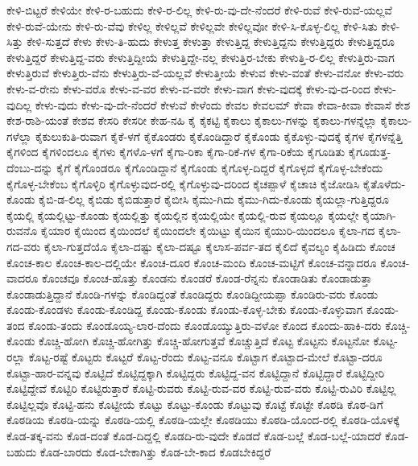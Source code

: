 {ಕೇಳಿ-ಬಿಟ್ಟರೆ
ಕೇಳಿಯೇ
ಕೇಳಿ-ರ-ಬಹುದು
ಕೇಳಿ-ರ-ಲಿಲ್ಲ
ಕೇಳಿ-ರು-ವು-ದೇ-ನೆಂದರೆ
ಕೇಳಿ-ರುವೆ
ಕೇಳಿ-ರುವೆ-ಯಲ್ಲವೆ
ಕೇಳಿ-ರುವೆ-ಯೇನು
ಕೇಳಿ-ರು-ವೆವು
ಕೇಳಿಲ್ಲ
ಕೇಳಿಲ್ಲವೆ
ಕೇಳಿಲ್ಲವೇ
ಕೇಳಿಲ್ಲವೋ
ಕೇಳಿ-ಸಿ-ಕೊಳ್ಳ-ಲಿಲ್ಲ
ಕೇಳಿ-ಸಿತು
ಕೇಳಿ-ಸಿತ್ತು
ಕೇಳಿ-ಸುತ್ತದೆ
ಕೇಳು
ಕೇಳು-ತಿ-ಹುದು
ಕೇಳುತ್ತ
ಕೇಳುತ್ತಾ
ಕೇಳುತ್ತಿದ್ದ
ಕೇಳುತ್ತಿದ್ದನು
ಕೇಳುತ್ತಿದ್ದರು
ಕೇಳುತ್ತಿದ್ದರೂ
ಕೇಳುತ್ತಿದ್ದರೆ
ಕೇಳುತ್ತಿದ್ದ-ವರು
ಕೇಳುತ್ತಿದ್ದೀಯೆ
ಕೇಳುತ್ತಿದ್ದೇ-ನಲ್ಲ
ಕೇಳುತ್ತಿರ-ಬೇಕು
ಕೇಳುತ್ತಿ-ರ-ಲಿಲ್ಲ
ಕೇಳುತ್ತಿರು-ವಾಗ
ಕೇಳುತ್ತಿರುವೆ
ಕೇಳುತ್ತಿರು-ವೆನು
ಕೇಳುತ್ತಿರು-ವೆ-ಯಲ್ಲವೆ
ಕೇಳುತ್ತೀಯೆ
ಕೇಳುವ
ಕೇಳು-ವಂತೆ
ಕೇಳು-ವನೋ
ಕೇಳು-ವರು
ಕೇಳು-ವ-ರೇನು
ಕೇಳು-ವರೊ
ಕೇಳು-ವ-ವರ
ಕೇಳು-ವ-ವರೇ
ಕೇಳು-ವಾಗ
ಕೇಳು-ವುದಕ್ಕೆ
ಕೇಳು-ವು-ದ-ರಿಂದ
ಕೇಳು-ವುದಿಲ್ಲ
ಕೇಳು-ವುದು
ಕೇಳು-ವು-ದೇ-ನೆಂದರೆ
ಕೇಳುವೆ
ಕೇಳೆಂದು
ಕೇವಲ
ಕೇವಲಮ್
ಕೇವಾ
ಕೇವಾ-ಕೀವಾ
ಕೇವಾಸೆ
ಕೇಶ
ಕೇಶ-ರಾಶಿ-ಯಂತೆ
ಕೇಶವ
ಕೇಸರಿ
ಕೇಸರೀ
ಕೇಹ-ನಹಿ
ಕೈ
ಕೈಕಟ್ಟಿ
ಕೈಕಾಲು
ಕೈಕಾಲು-ಗಳನ್ನು
ಕೈಕಾಲು-ಗಳನ್ನೆಲ್ಲಾ
ಕೈಕಾಲು-ಗಳೆಲ್ಲಾ
ಕೈಕುಲುಕುತಿ-ರುವಾಗ
ಕೈಕೆ-ಳಗೆ
ಕೈಕೊಂಡರು
ಕೈಕೊಂಡಿದ್ದಾರೆ
ಕೈಕೊಂಡು
ಕೈಕೊಳ್ಳು-ವುದಕ್ಕೆ
ಕೈಗಳ
ಕೈಗಳನ್ನೆತ್ತಿ
ಕೈಗಳಿಂದ
ಕೈಗಳಿಂದಲೂ
ಕೈಗಳು
ಕೈಗಳೊ-ಳಗೆ
ಕೈಗಾ-ರಿಕಾ
ಕೈಗಾ-ರಿಕೆ-ಗಳ
ಕೈಗಾ-ರಿಕೆಯ
ಕೈಗೂಡಿತು
ಕೈಗೂಡುತ್ತ-ದೆಂಬು-ದನ್ನು
ಕೈಗೆ
ಕೈಗೊಂಡರೂ
ಕೈಗೊಂಡಿದ್ದಾನೆ
ಕೈಗೊಂಡು
ಕೈಗೊಳ್ಳ-ದಿದ್ದರೆ
ಕೈಗೊಳ್ಳದೆ
ಕೈಗೊಳ್ಳ-ಬೇಕೆಂದು
ಕೈಗೊಳ್ಳ-ಬೇಕೆಂಬ
ಕೈಗೊಳ್ಳಿರಿ
ಕೈಗೊಳ್ಳುವುದ-ರಲ್ಲಿ
ಕೈಗೊಳ್ಳುವು-ದರಿಂದ
ಕೈಚಪ್ಪಾಳೆ
ಕೈಚಾಚಿ
ಕೈಜೋಡಿಸಿ
ಕೈತೊಳೆದು-ಕೊಂಡು
ಕೈಬಿ-ಡ-ಲಿಲ್ಲ
ಕೈಬಿಡು
ಕೈಬಿಡುತ್ತಾರೆ
ಕೈಬೀಸಿ
ಕೈಮು-ಗಿದು
ಕೈಮು-ಗಿದು-ಕೊಂಡು
ಕೈಯಲ್ಲಾ-ಗುತ್ತಿದ್ದರೂ
ಕೈಯಲ್ಲಿ
ಕೈಯಲ್ಲಿಟ್ಟು-ಕೊಂಡು
ಕೈಯಲ್ಲಿತ್ತು
ಕೈಯಲ್ಲಿನ
ಕೈಯಲ್ಲಿಯೇ
ಕೈಯಲ್ಲಿ-ರುವ
ಕೈಯಲ್ಲೂ
ಕೈಯಲ್ಲೇ
ಕೈಯಾಗಿ-ರುವನೊ
ಕೈಯಾರ
ಕೈಯಿಂದ
ಕೈಯಿಂದಲೆ
ಕೈಯಿಂದಲೇ
ಕೈಯಿಟ್ಟು
ಕೈಯಿನ
ಕೈಯುರಿ-ಯಿಂದಲೂ
ಕೈಲಾ-ಗದ
ಕೈಲಾ-ಗದ-ವರು
ಕೈಲಾ-ಗುತ್ತದೆಯೊ
ಕೈಲಾ-ದಷ್ಟು
ಕೈಲಾ-ದಷ್ಟೂ
ಕೈಲಾಸ-ಪರ್ವ-ತದ
ಕೈಲಿದೆ
ಕೈವಲ್ಯಂ
ಕೈಹಿಡಿದು
ಕೊಂಚ
ಕೊಂಚ-ಕಾಲ
ಕೊಂಚ-ಕಾಲ-ದಲ್ಲಿಯೇ
ಕೊಂಚ-ದೂರ
ಕೊಂಚ-ಮಂದಿ
ಕೊಂಚ-ಮಟ್ಟಿಗೆ
ಕೊಂಚ-ವನ್ನಾದರೂ
ಕೊಂಚ-ವಾದರೂ
ಕೊಂಚವೂ
ಕೊಂಚ-ಹೊತ್ತು
ಕೊಂಡನು
ಕೊಂಡರೆ
ಕೊಂಡ-ರೆನ್ನನು
ಕೊಂಡಾಡಿತು
ಕೊಂಡಾಡುತ್ತಾ
ಕೊಂಡಾಡುತ್ತಿದ್ದಾನೆ
ಕೊಂಡಿ-ಗಳನ್ನು
ಕೊಂಡಿದ್ದಂತೆ
ಕೊಂಡಿದ್ದರು
ಕೊಂಡಿದ್ದೀಯಪ್ಪಾ
ಕೊಂಡಿರು-ವರು
ಕೊಂಡು
ಕೊಂಡು-ಕೊಂಡಳು
ಕೊಂಡು-ಕೊಂಡಿದ್ದ
ಕೊಂಡು-ಕೊಂಡು
ಕೊಂಡು-ಕೊಳ್ಳ-ಬೇಕು
ಕೊಂಡು-ಕೊಳ್ಳುವಾಗ
ಕೊಂಡು-ತಂದ
ಕೊಂಡು-ತಂದು
ಕೊಂಡೊಯ್ಯ-ಲಾರ-ದೆಂದು
ಕೊಂಡೊಯ್ಯುತ್ತಿರು-ವಳೋ
ಕೊಂದ
ಕೊಂದು-ಹಾಕಿ-ದರು
ಕೊಚ್ಚಿ-ಕೊಂಡು
ಕೊಚ್ಚಿ-ಹೋಗಿ
ಕೊಚ್ಚಿ-ಹೋಗಿತ್ತು
ಕೊಚ್ಚಿ-ಹೋಗುತ್ತವೆ
ಕೊಚ್ಚುತ್ತಿದೆ
ಕೊಟ್ಟ
ಕೊಟ್ಟನು
ಕೊಟ್ಟನೋ
ಕೊಟ್ಟ-ರಲ್ಲಾ
ಕೊಟ್ಟ-ರಷ್ಟೆ
ಕೊಟ್ಟರು
ಕೊಟ್ಟರೆ
ಕೊಟ್ಟ-ರೆಂದು
ಕೊಟ್ಟ-ವನೂ
ಕೊಟ್ಟಾಗ
ಕೊಟ್ಟಾದ-ಮೇಲೆ
ಕೊಟ್ಟಾ-ದರೂ
ಕೊಟ್ಟಾ-ಹಾರ-ವನ್ನವು
ಕೊಟ್ಟಿದೆ
ಕೊಟ್ಟಿದ್ದಕ್ಕಾಗಿ
ಕೊಟ್ಟಿದ್ದರು
ಕೊಟ್ಟಿದ್ದ-ವನ
ಕೊಟ್ಟಿದ್ದಾನೆ
ಕೊಟ್ಟಿದ್ದಾರೆ
ಕೊಟ್ಟಿದ್ದೀರಿ
ಕೊಟ್ಟಿದ್ದೇವೆ
ಕೊಟ್ಟಿರಿ
ಕೊಟ್ಟಿರುತ್ತಾರೆ
ಕೊಟ್ಟಿ-ರುವರು
ಕೊಟ್ಟಿ-ರುವ-ವರ
ಕೊಟ್ಟಿ-ರುವ-ವರು
ಕೊಟ್ಟಿ-ರುವಿರಿ
ಕೊಟ್ಟಿಲ್ಲ
ಕೊಟ್ಟಿಲ್ಲವೊ
ಕೊಟ್ಟಿ-ಹನು
ಕೊಟ್ಟೀಯೆ
ಕೊಟ್ಟು
ಕೊಟ್ಟು-ಕೊಂಡು
ಕೊಟ್ಟುವು
ಕೊಟ್ಟೆ
ಕೊಟ್ಟೇ
ಕೊಠಡಿ
ಕೊಠ-ಡಿಗೆ
ಕೊಠಡಿಯ
ಕೊಠಡಿ-ಯನ್ನು
ಕೊಠಡಿ-ಯಲ್ಲಿ
ಕೊಠಡಿ-ಯಲ್ಲೇ
ಕೊಠಡಿಯು
ಕೊಠಡಿ-ಯೊಂದ-ರಲ್ಲಿ
ಕೊಠಡಿ-ಯೊಳಕ್ಕೆ
ಕೊಡ-ತಕ್ಕ-ವನು
ಕೊಡ-ದಂತೆ
ಕೊಡ-ದಿದ್ದಲ್ಲಿ
ಕೊಡದಿ-ರು-ವುದೇ
ಕೊಡದೆ
ಕೊಡ-ಬಲ್ಲೆ
ಕೊಡ-ಬಲ್ಲೆ-ಯಾದರೆ
ಕೊಡ-ಬಹುದು
ಕೊಡ-ಬಾರದು
ಕೊಡ-ಬೇಕಾಗಿತ್ತು
ಕೊಡ-ಬೇ-ಕಾದ
ಕೊಡಬೇಕಿದ್ದರೆ
}
